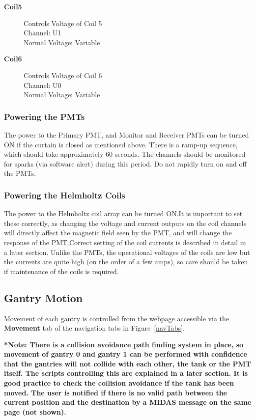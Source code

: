 \documentclass[twoside,letterpaper]{refart}
\begin{document}
\begin{description}
	\item[\textbf{Coil5}] Controls Voltage of Coil 5 \\
	Channel: U1 \\
	Normal Voltage: Variable
	
	\item[\textbf{Coil6}] Controls Voltage of Coil 6 \\
	Channel: U0 \\
	Normal Voltage: Variable
	
\end{description}

\subsubsection{Powering the PMTs}

The power to the Primary PMT, and Monitor and Receiver PMTs can be turned ON if the curtain is closed as mentioned above. There is a ramp-up sequence, which should take approximately 60 seconds. The channels should be monitored for sparks (via software alert) during this period. Do not rapidly turn on and off the PMTs.

\subsubsection{Powering the Helmholtz Coils}

The power to the Helmholtz coil array can be turned ON.\@ It is important to set these correctly, as changing the voltage and current outputs on the coil channels will directly affect the magnetic field seen by the PMT, and will change the response of the PMT.\@ Correct setting of the coil currents is described in detail in a later section. Unlike the PMTs, the operational voltages of the coils are low but the currents are quite high (on the order of a few amps), so care should be taken if maintenance of the coils is required.

\subsection{Gantry Motion}

Movement of each gantry is controlled from the webpage accessible via the \textbf{Movement} tab of the navigation tabs in Figure~\ref{navTabs}.

\textbf{*Note: There is a collision avoidance path finding system in place, so movement of gantry 0 and gantry 1 can be performed with confidence that the gantries will not collide with each other, the tank or the PMT itself. The scripts controlling this are explained in a later section. It is good practice to check the collision avoidance if the tank has been moved. The user is notified if there is no valid path between the current position and the destination by a MIDAS message on the same page (not shown).}
\end{document}
